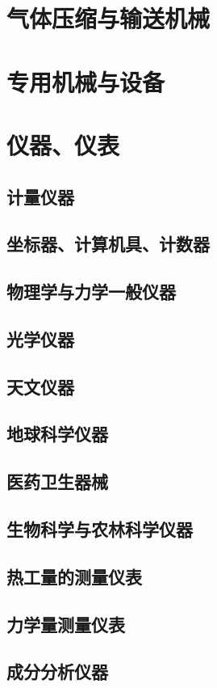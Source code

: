 \documentclass[UTF8]{../../ApplicationUniverse}
\begin{document}
\chapter{气体压缩与输送机械}

\chapter{专用机械与设备}

\chapter{仪器、仪表}
\section{计量仪器}
\section{坐标器、计算机具、计数器}
\section{物理学与力学一般仪器}
\section{光学仪器}
\section{天文仪器}
\section{地球科学仪器}
\section{医药卫生器械}
\section{生物科学与农林科学仪器}
\section{热工量的测量仪表}
\section{力学量测量仪表}
\section{成分分析仪器}
\end{document}

